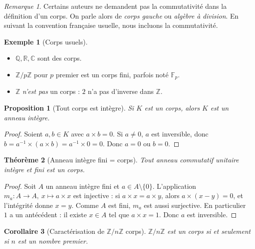 \documentclass[12pt,a4paper]{report}
\newtheorem{theoreme}{Théorème}[section]
\newtheorem{proposition}[theoreme]{Proposition}
\newtheorem{corollaire}[theoreme]{Corollaire}
\theoremstyle{definition}
\newtheorem{exemple}{Exemple}[section]
\theoremstyle{remark}
\newtheorem{remarque}{Remarque}[section]
\begin{document}
\begin{remarque}
Certains auteurs ne demandent pas la commutativité dans la définition d'un corps. On parle alors de \emph{corps gauche} ou \emph{algèbre à division}. En suivant la convention française usuelle, nous incluons la commutativité.
\end{remarque}

\begin{exemple}[Corps usuels]
\begin{itemize}
    \item $\mathbb{Q}, \mathbb{R}, \mathbb{C}$ sont des corps.
    \item $\mathbb{Z}/p\mathbb{Z}$ pour $p$ premier est un corps fini, parfois noté $\mathbb{F}_p$.
    \item $\mathbb{Z}$ \emph{n'est pas} un corps : $2$ n'a pas d'inverse dans $\mathbb{Z}$.
\end{itemize}
\end{exemple}

\begin{proposition}[Tout corps est intègre]
Si $K$ est un corps, alors $K$ est un anneau intègre.
\end{proposition}

\begin{proof}
Soient $a, b \in K$ avec $a \times b = 0$. Si $a \neq 0$, $a$ est inversible, donc $b = a^{-1} \times (a \times b) = a^{-1} \times 0 = 0$. Donc $a = 0$ ou $b = 0$.
\end{proof}

\begin{theoreme}[Anneau intègre fini = corps]
Tout anneau commutatif unitaire \emph{intègre} et \emph{fini} est un corps.
\end{theoreme}

\begin{proof}
Soit $A$ un anneau intègre fini et $a \in A \setminus \{0\}$. L'application $m_a : A \to A,\ x \mapsto a \times x$ est injective : si $a \times x = a \times y$, alors $a \times (x - y) = 0$, et l'intégrité donne $x = y$. Comme $A$ est fini, $m_a$ est aussi surjective. En particulier $1$ a un antécédent : il existe $x \in A$ tel que $a \times x = 1$. Donc $a$ est inversible.
\end{proof}

\begin{corollaire}[Caractérisation de $\mathbb{Z}/n\mathbb{Z}$ corps]
$\mathbb{Z}/n\mathbb{Z}$ est un corps si et seulement si $n$ est un nombre premier.
\end{corollaire}
\end{document}
